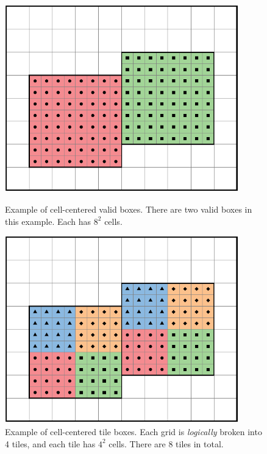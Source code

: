 {{\begin{figure}
  \centering
  \begin{minipage}{0.45\textwidth}
    \centering
    \includegraphics[width=0.9\textwidth]{./Basics/cc_validbox.pdf}
    \caption{\label{fig:basics:cc_validbox} Example of cell-centered valid boxes. There are two
    valid boxes in this example. Each has $8^2$ cells.}
  \end{minipage}\hfill
  \begin{minipage}{0.45\textwidth}
    \centering
    \includegraphics[width=0.9\textwidth]{./Basics/cc_tilebox.pdf}
    \caption{\label{fig:basics:cc_tilebox} Example of cell-centered tile boxes.
      Each grid is {\emph{logically}} broken into 4 tiles, and each
      tile has $4^2$ cells.  There are 8 tiles in total.}
  \end{minipage}
\end{figure}

}}
